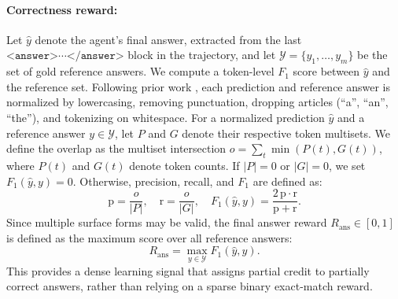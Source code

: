 \documentclass{article} %
\begin{document}
\paragraph{Correctness reward:}

Let $\hat{y}$ denote the agent's final answer, extracted from the last
$\texttt{<answer>} \cdots \texttt{</answer>}$ block in the trajectory, and let
$\mathcal{Y}=\{y_1,\dots,y_m\}$ be the set of gold reference answers. We compute
a token-level $F_1$ score between $\hat{y}$ and the reference set. Following
prior work \citep{rajpurkar-etal-2016-squad}, each prediction and reference
answer is normalized by lowercasing, removing punctuation, dropping articles
(``a'', ``an'', ``the''), and tokenizing on whitespace. For a normalized prediction $\hat{y}$ and a reference answer $y \in \mathcal{Y}$,
let $P$ and $G$ denote their respective token multisets. We define the overlap as
the multiset intersection
$o = \sum_t \min(P(t), G(t))$, where $P(t)$ and $G(t)$ denote token counts. If $|P|=0$ or $|G|=0$, we set $F_1(\hat{y}, y)=0$. Otherwise, precision, recall,
and $F_1$ are defined as:
\begin{equation}
\mathrm{p} = \frac{o}{|P|}, \quad
\mathrm{r} = \frac{o}{|G|}, \quad
F_1(\hat{y}, y) = \frac{2\,\mathrm{p}\cdot\mathrm{r}}{\mathrm{p}+\mathrm{r}}.
\end{equation}
Since multiple surface forms may be valid, the final answer reward
$R_{\mathrm{ans}} \in [0,1]$ is defined as the maximum score over all reference
answers:
\begin{equation}
R_{\mathrm{ans}} = \max_{y \in \mathcal{Y}} F_1(\hat{y}, y).
\end{equation}
This provides a dense learning signal that assigns partial credit to partially
correct answers, rather than relying on a sparse binary exact-match reward.
\end{document}
